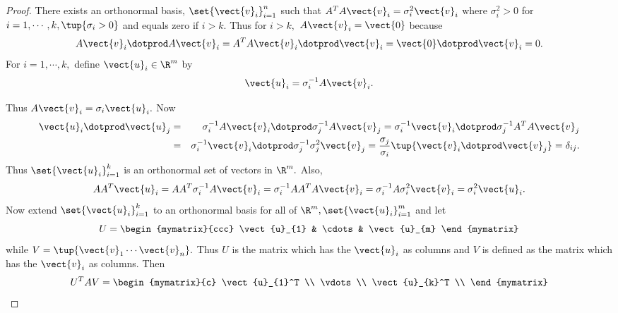 \begin{proof}
There exists an orthonormal basis, $\set{\vect{v}_{i}} _{i=1}^{n}$ such that $
A^TA\vect{v}_{i}=\sigma _{i}^{2}\vect{v}_{i}$ where $\sigma
_{i}^{2}>0$ for $i=1,\cdots ,k,\tup{\sigma _{i}>0} $ and equals zero
if $i>k.$ Thus for $i>k,$ $A\vect{v}_{i}=\vect{0}$ because 
\begin{equation*}
 A\vect{v}_{i}\dotprod A\vect{v}_{i} = A^TA\vect{v}_{i} \dotprod \vect{v}_{i}  = \vect{0} \dotprod \vect{v}_{i} =0.
\end{equation*}
For $i=1,\cdots ,k,$ define $\vect{u}_{i}\in \R^{m}$ by 
\begin{equation*}
\vect{u}_{i}= \sigma _{i}^{-1}A\vect{v}_{i}.
\end{equation*}

Thus $A\vect{v}_{i}=\sigma _{i}\vect{u}_{i}.$ Now 
\begin{eqnarray*}
\vect{u}_{i} \dotprod \vect{u}_{j} &=&  \sigma _{i}^{-1}A
\vect{v}_{i} \dotprod \sigma _{j}^{-1}A\vect{v}_{j}  = \sigma_{i}^{-1}\vect{v}_{i} \dotprod \sigma _{j}^{-1}A^TA\vect{v}_{j} \\
&=& \sigma _{i}^{-1}\vect{v}_{i} \dotprod \sigma _{j}^{-1}\sigma _{j}^{2} \vect{v}_{j} =
\frac{\sigma _{j}}{\sigma _{i}}\tup{\vect{v}_{i} \dotprod \vect{v}_{j}}
=\delta _{ij}.
\end{eqnarray*}
Thus $\set{\vect{u}_{i}} _{i=1}^{k}$ is an orthonormal set of
vectors in $\R^{m}.$ Also, 
\begin{equation*}
AA^T\vect{u}_{i}=AA^T\sigma _{i}^{-1}A\vect{v}_{i}=\sigma
_{i}^{-1}AA^TA\vect{v}_{i}=\sigma _{i}^{-1}A\sigma _{i}^{2}\vect{v}
_{i}=\sigma _{i}^{2}\vect{u}_{i}.
\end{equation*}
Now extend $\set{\vect{u}_{i}} _{i=1}^{k}$ to an orthonormal
basis for all of $\R^{m},\set{\vect{u}_{i}} _{i=1}^{m}$
and let 
\begin{equation*}
U= \begin{mymatrix}{ccc}
\vect{u}_{1} & \cdots & \vect{u}_{m}
\end{mymatrix}
\end{equation*}
while $V= \tup{\vect{v}_{1}\cdots \vect{v}_{n}} .$ Thus $U$
is the matrix which has the $\vect{u}_{i}$ as columns and $V$ is defined
as the matrix which has the $\vect{v}_{i}$ as columns. Then 
\begin{equation*}
U^TAV=\begin{mymatrix}{c}
\vect{u}_{1}^T \\ 
\vdots \\ 
\vect{u}_{k}^T \\ 

\end{mymatrix}
\end{equation*}
\end{proof}
